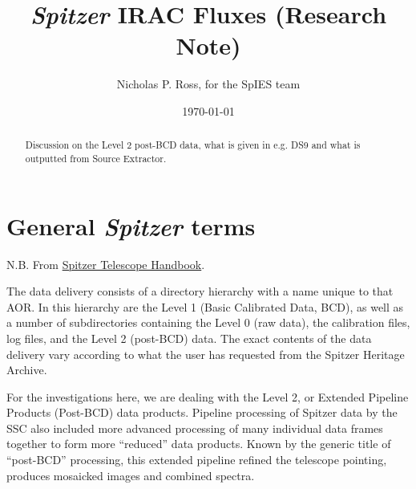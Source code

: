 \documentclass[11pt,a4paper]{article}
\begin{document}
\title{{\it Spitzer} IRAC Fluxes (Research Note)}
\author{Nicholas P. Ross, for the SpIES team}
\date{\today}
\maketitle



\begin{abstract}
Discussion on the Level 2 post-BCD data, what is given in 
e.g. DS9 and what is outputted from Source Extractor. 
\end{abstract}

\section*{General {\it Spitzer} terms}
N.B. From 
\href{http://irsa.ipac.caltech.edu/data/SPITZER/docs/spitzermission/missionoverview/spitzertelescopehandbook/18/}{Spitzer Telescope Handbook}. 

\smallskip
The data delivery consists of a directory hierarchy with a name unique to that AOR.  In this hierarchy are the Level 1 (Basic Calibrated Data, BCD), as well as a number of subdirectories containing the Level 0 (raw data), the calibration files, log files, and the Level 2 (post-BCD) data. The exact contents of the data delivery vary according to what the user has requested from the Spitzer Heritage Archive. 

For the investigations here, we are dealing with the Level 2, or Extended Pipeline Products (Post-BCD) data products. Pipeline processing of Spitzer data by the SSC also included more advanced processing of many individual data frames together to form more “reduced” data products. Known by the generic title of ``post-BCD'' processing, this extended pipeline refined the telescope pointing, produces mosaicked images and combined spectra. 
\end{document}
